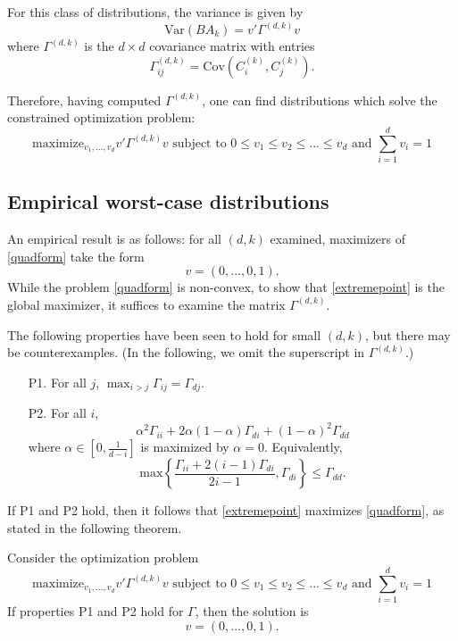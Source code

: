 \documentclass[12pt]{article}
\begin{document}
For this class of distributions, the variance is given by
\[
\text{Var}(BA_k) = v' \Gamma^{(d, k)} v
\]
where $\Gamma^{(d, k)}$ is the $d \times d$ covariance matrix with entries
\[
\Gamma^{(d, k)}_{ij} = \text{Cov}(C^{(k)}_i, C^{(k)}_j).
\]

Therefore, having computed $\Gamma^{(d, k)}$, one can find distributions which solve the constrained optimization problem:
\begin{equation}\label{quadform}
\text{maximize}_{v_1,...,v_d} v'\Gamma^{(d, k)} v\text{ subject to } 0 \leq v_1 \leq v_2 \leq ... \leq v_d \text{ and }\sum_{i=1}^d v_i = 1
\end{equation}

\subsection{Empirical worst-case distributions}

An empirical result is as follows: for all $(d, k)$ examined,
maximizers of \eqref{quadform} take the form
\begin{equation}\label{extremepoint}
v = (0, ..., 0, 1).
\end{equation}
While the problem \eqref{quadform} is non-convex, to show
that \eqref{extremepoint} is the global maximizer, it suffices to
examine the matrix $\Gamma^{(d,k)}$.

The following properties have been seen to hold for small $(d, k)$,
but there may be counterexamples.  (In the following, we omit the superscript in
$\Gamma^{(d,k)}$.)
\begin{itemize}
\item[P1.] For all $j$, $\max_{i > j} \Gamma_{ij} = \Gamma_{dj}.$
\item[P2.] For all $i$,
\[
\alpha^2 \Gamma_{ii} + 2\alpha(1-\alpha) \Gamma_{di} + (1-\alpha)^2\Gamma_{dd}
\]
where $\alpha \in [0,\frac{1}{d-i}]$
is maximized by $\alpha = 0$.
Equivalently,
\[
\text{max}\left\{\frac{\Gamma_{ii} + 2(i-1)\Gamma_{di}}{2i-1}, \Gamma_{di}\right\} \leq \Gamma_{dd}.
\]
\end{itemize}
If P1 and P2 hold, then it follows that \eqref{extremepoint} maximizes \eqref{quadform}, as stated in the following theorem.

\begin{theorem}
Consider the optimization problem
\[
\text{maximize}_{v_1,...,v_d} v'\Gamma^{(d, k)} v\text{ subject to } 0 \leq v_1 \leq v_2 \leq ... \leq v_d \text{ and }\sum_{i=1}^d v_i = 1
\]
If properties P1 and P2 hold for $\Gamma$, then the solution is
\[
v = (0, ..., 0, 1).
\]
\end{theorem}
\end{document}
